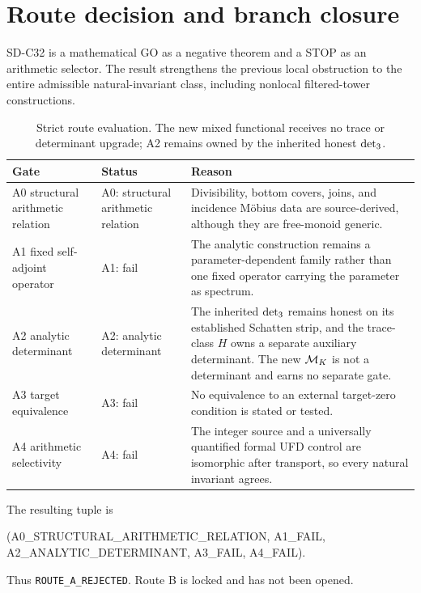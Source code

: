 \section{Route decision and branch closure}
\label{sec:route}

SD-C32 is a mathematical GO as a negative theorem and a STOP as an
arithmetic selector.  The result strengthens the previous local obstruction
to the entire admissible natural-invariant class, including nonlocal
filtered-tower constructions.

\begin{table}[H]
\centering
\small
\caption{Strict route evaluation.  The new mixed functional receives no
trace or determinant upgrade; A2 remains owned by the inherited honest
\(\detthree\).}
\label{tab:route}
\begin{tabularx}{\textwidth}{L{0.20\textwidth}L{0.19\textwidth}Y}
\toprule
Gate & Status & Reason\\
\midrule
A0 structural arithmetic relation &
A0: structural arithmetic relation &
Divisibility, bottom covers, joins, and incidence M{\"o}bius data are
source-derived, although they are free-monoid generic.\\
A1 fixed self-adjoint operator & A1: fail &
The analytic construction remains a parameter-dependent family rather than
one fixed operator carrying the parameter as spectrum.\\
A2 analytic determinant & A2: analytic determinant &
The inherited \(\detthree\) remains honest on its established Schatten
strip, and the trace-class \(H\) owns a separate auxiliary determinant.
The new \(\mathcal M_K\) is not a determinant and earns no separate gate.\\
A3 target equivalence & A3: fail &
No equivalence to an external target-zero condition is stated or tested.\\
A4 arithmetic selectivity & A4: fail &
The integer source and a universally quantified formal UFD control are
isomorphic after transport, so every natural invariant agrees.\\
\bottomrule
\end{tabularx}
\end{table}

The resulting tuple is
\begin{center}
\small\ttfamily
(A0\_STRUCTURAL\_ARITHMETIC\_RELATION, A1\_FAIL,\\
A2\_ANALYTIC\_DETERMINANT, A3\_FAIL, A4\_FAIL).
\end{center}
Thus \texttt{ROUTE\_A\_REJECTED}.  Route B is locked and has not been opened.

